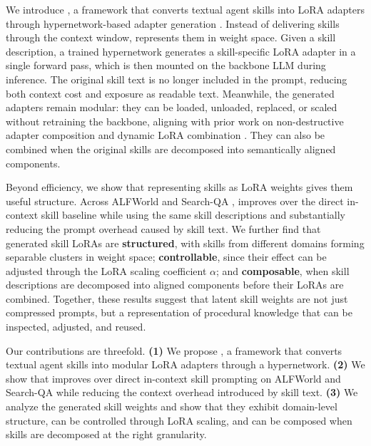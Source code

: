 We introduce \textbf{\method{}}, a framework that converts textual agent skills into LoRA adapters through hypernetwork-based adapter generation \citep{Ha2017Hypernetwork, Hu2022LoRA, Liu2026SHINE}.
Instead of delivering skills through the context window, \method{} represents them in weight space.
Given a skill description, a trained hypernetwork generates a skill-specific LoRA adapter in a single forward pass, which is then mounted on the backbone LLM during inference.
The original skill text is no longer included in the prompt, reducing both context cost and exposure as readable text.
Meanwhile, the generated adapters remain modular: they can be loaded, unloaded, replaced, or scaled without retraining the backbone, aligning with prior work on non-destructive adapter composition and dynamic LoRA combination \citep{Pfeiffer2021AdapterFusion, Huang2024LoraHub}.
They can also be combined when the original skills are decomposed into semantically aligned components.

Beyond efficiency, we show that representing skills as LoRA weights gives them useful structure.
Across ALFWorld \citep{Shridhar2021ALFWorld} and Search-QA \citep{Jin2025SearchR1}, \method{} improves over the direct in-context skill baseline while using the same skill descriptions and substantially reducing the prompt overhead caused by skill text.
We further find that generated skill LoRAs are \textbf{structured}, with skills from different domains forming separable clusters in weight space; \textbf{controllable}, since their effect can be adjusted through the LoRA scaling coefficient $\alpha$; and \textbf{composable}, when skill descriptions are decomposed into aligned components before their LoRAs are combined.
Together, these results suggest that latent skill weights are not just compressed prompts, but a representation of procedural knowledge that can be inspected, adjusted, and reused.

Our contributions are threefold. 
\textbf{(1)} We propose \method{}, a framework that converts textual agent skills into modular LoRA adapters through a hypernetwork. 
\textbf{(2)} We show that \method{} improves over direct in-context skill prompting on ALFWorld and Search-QA while reducing the context overhead introduced by skill text. 
\textbf{(3)} We analyze the generated skill weights and show that they exhibit domain-level structure, can be controlled through LoRA scaling, and can be composed when skills are decomposed at the right granularity.
